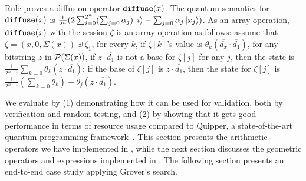 Rule  proves a diffusion operator $\texttt{diffuse}(x)$.
The quantum semantics for $\texttt{diffuse}(x)$ is $\frac{1}{2^{n}}(2\sum_{i=0}^{2^n}(\sum_{j=0}\alpha_j)\left\vert{i}\right\rangle - \sum_{j=0}\alpha_j\left\vert{x_j}\right\rangle)$.
As an array operation, $\texttt{diffuse}(x)$ with the session $\zeta$ is an array operation as follows:
assume that $\zeta=(x,0,\Sigma(x))\uplus\zeta_1$, for every $k$,
if $\zeta[k]$'s value is $\theta_k(\overline{d_x}\cdot \overline{d_1})$,
for any bitstring $z$ in $\mathcal{P}(\Sigma(x))$, if $z\cdot \overline{d_1}$
is not a base for $\zeta[j]$ for any $j$, then the state is
$\frac{1}{2^{n-1}}\sum_{k=0}\theta_k(z\cdot \overline{d_1})$;
if the base of $\zeta[j]$ is $z\cdot \overline{d_1}$,
then the state for $\zeta[j]$ is $\frac{1}{2^{n-1}}(\sum_{k=0}\theta_k)-\theta_j(z\cdot \overline{d_1})$.



We evaluate \name by (1) demonstrating how it can be used for validation, both by verification and random testing, and (2) by showing that it gets good performance in terms of resource usage compared to Quipper, a state-of-the-art quantum programming framework~\cite{Green2013}.
%
This section presents the arithmetic operators we have implemented in
\oqasm, while the next section discusses the geometric operators and
expressions implemented in \vqimp. The following section presents an
end-to-end case study applying Grover's search.

